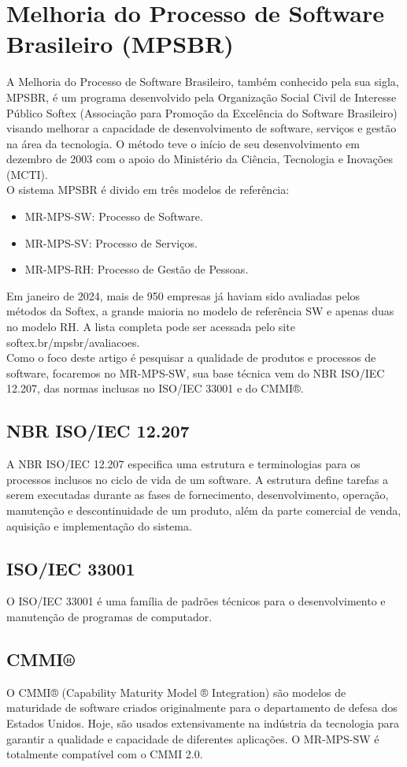 \documentclass{article}
\begin{document}
\section{Melhoria do Processo de Software Brasileiro (MPSBR)}
A Melhoria do Processo de Software Brasileiro, também conhecido pela sua sigla, MPSBR, é um programa desenvolvido pela Organização Social Civil de Interesse Público Softex (Associação para Promoção da Excelência do Software Brasileiro) visando melhorar a capacidade de desenvolvimento de software, serviços e gestão na área da tecnologia. O método teve o início de seu desenvolvimento em dezembro de 2003 com o apoio do Ministério da Ciência, Tecnologia e Inovações (MCTI). \\
O sistema MPSBR é divido em três modelos de referência:

\begin{itemize}
    \item MR-MPS-SW: Processo de Software.
    \item MR-MPS-SV: Processo de Serviços.
    \item MR-MPS-RH: Processo de Gestão de Pessoas.
\end{itemize}
Em janeiro de 2024, mais de 950 empresas já haviam sido avaliadas pelos métodos da Softex, a grande maioria no modelo de referência SW e apenas duas no modelo RH. A lista completa pode ser acessada pelo site softex.br/mpsbr/avaliacoes. \\
Como o foco deste artigo é pesquisar a qualidade de produtos e processos de software, focaremos no MR-MPS-SW, sua base técnica vem do NBR ISO/IEC 12.207, das normas inclusas no ISO/IEC 33001 e do CMMI®.
\subsection{NBR ISO/IEC 12.207}
A NBR ISO/IEC 12.207 especifica uma estrutura e terminologias para os processos inclusos no ciclo de vida de um software. A estrutura define tarefas a serem executadas durante as fases de fornecimento, desenvolvimento, operação, manutenção e descontinuidade de um produto, além da parte comercial de venda, aquisição e implementação do sistema.
\subsection{ISO/IEC 33001}
O ISO/IEC 33001 é uma família de padrões técnicos para o desenvolvimento e manutenção de programas de computador.
\subsection{CMMI®}
O CMMI® (Capability Maturity Model ® Integration) são modelos de maturidade de software criados originalmente para o departamento de defesa dos Estados Unidos. Hoje, são usados extensivamente na indústria da tecnologia para garantir a qualidade e capacidade de diferentes aplicações. O MR-MPS-SW é totalmente compatível com o CMMI 2.0.
\end{document}
